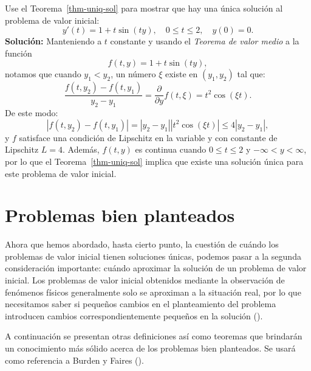 \documentclass[
  spanish,
  us-letterpaper,
]{scrreprt}
\theoremstyle{plain}
\theoremstyle{definition}
\theoremstyle{remark}
\begin{document}
\begin{tcolorbox}[enhanced jigsaw, rightrule=.15mm, breakable, toprule=.15mm, bottomrule=.15mm, colframe=quarto-callout-caution-color-frame, bottomtitle=1mm, left=2mm, toptitle=1mm, title={Ejemplo}, opacityback=0, coltitle=black, opacitybacktitle=0.6, leftrule=.75mm, colbacktitle=quarto-callout-caution-color!10!white, colback=white, titlerule=0mm, arc=.35mm]

Use el Teorema~\ref{thm-uniq-sol} para mostrar que hay una única
solución al problema de valor inicial: \[
y'(t)= 1 + t\sin(ty), \quad 0\leq t \leq 2, \quad y(0) = 0.
\] \textbf{Solución:} Manteniendo a \(t\) constante y usando el
\emph{Teorema de valor medio} a la función \[
f(t,y) = 1 + t\sin(ty),
\] notamos que cuando \(y_1<y_2\), un número \(\xi\) existe en
\((y_1,y_2)\) tal que: \[
\dfrac{f(t,y_2)-f(t,y_1)}{y_2-y_1} = \dfrac{\partial}{\partial y} f(t,\xi) = t^2\cos(\xi t).
\] De este modo: \[
|f(t,y_2)-f(t,y_1)| = |y_2-y_1||t^2\cos(\xi t)| \leq 4|y_2-y_1|,
\] y \(f\) satisface una condición de Lipschitz en la variable y con
constante de Lipschitz \(L = 4\). Además, \(f(t, y)\) es continua cuando
\(0 ≤ t ≤ 2\) y \(−∞ < y < ∞\), por lo que el Teorema~\ref{thm-uniq-sol}
implica que existe una solución única para este problema de valor
inicial.

\end{tcolorbox}

\section{Problemas bien planteados}\label{problemas-bien-planteados}

Ahora que hemos abordado, hasta cierto punto, la cuestión de cuándo los
problemas de valor inicial tienen soluciones únicas, podemos pasar a la
segunda consideración importante: cuándo aproximar la solución de un
problema de valor inicial. Los problemas de valor inicial obtenidos
mediante la observación de fenómenos físicos generalmente solo se
aproximan a la situación real, por lo que necesitamos saber si pequeños
cambios en el planteamiento del problema introducen cambios
correspondientemente pequeños en la solución
().

A continuación se presentan otras definiciones así como teoremas que
brindarán un conocimiento más sólido acerca de los problemas bien
planteados. Se usará como referencia a Burden y Faires
().
\end{document}
